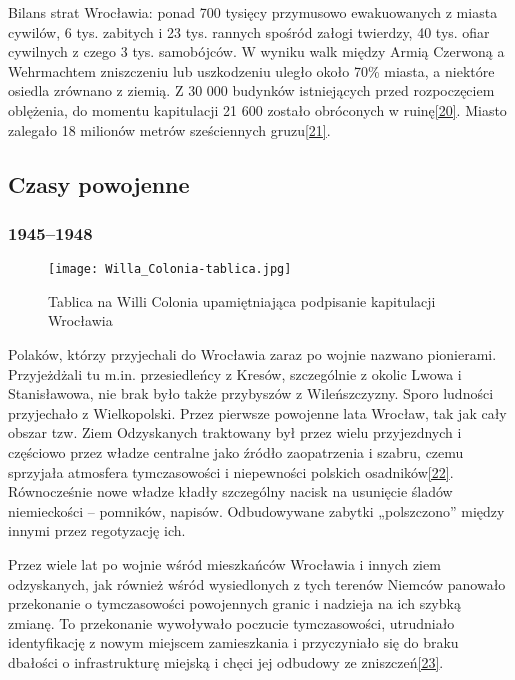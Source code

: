 \documentclass{article}
\begin{document}
Bilans strat Wrocławia: ponad 700 tysięcy przymusowo ewakuowanych z miasta cywilów, 6 tys. zabitych i 23 tys. rannych spośród załogi twierdzy, 40 tys. ofiar cywilnych z czego 3 tys. samobójców. W wyniku walk między Armią Czerwoną a Wehrmachtem zniszczeniu lub uszkodzeniu uległo około 70\% miasta, a niektóre osiedla zrównano z ziemią. Z 30 000 budynków istniejących przed rozpoczęciem oblężenia, do momentu kapitulacji 21 600 zostało obróconych w ruinę\hyperref[20]{[20]}. Miasto zalegało 18 milionów metrów sześciennych gruzu\hyperref[21]{[21]}.

\subsection{Czasy powojenne}
\subsubsection{1945–1948} 

\begin{wrapfigure}{r}{0.45\textwidth} 
\begin{center}
\vspace{-20pt}
\texttt{[image: Willa\_Colonia-tablica.jpg]}
\end{center}
\vspace{-20pt}
\caption{Tablica na Willi Colonia upamiętniająca podpisanie kapitulacji Wrocławia}
\vspace{-10pt}
\end{wrapfigure}

Polaków, którzy przyjechali do Wrocławia zaraz po wojnie nazwano pionierami. Przyjeżdżali tu m.in. przesiedleńcy z Kresów, szczególnie z okolic Lwowa i Stanisławowa, nie brak było także przybyszów z Wileńszczyzny. Sporo ludności przyjechało z Wielkopolski. Przez pierwsze powojenne lata Wrocław, tak jak cały obszar tzw. Ziem Odzyskanych traktowany był przez wielu przyjezdnych i częściowo przez władze centralne jako źródło zaopatrzenia i szabru, czemu sprzyjała atmosfera tymczasowości i niepewności polskich osadników\hyperref[22]{[22]}. Równocześnie nowe władze kładły szczególny nacisk na usunięcie śladów niemieckości – pomników, napisów. Odbudowywane zabytki „polszczono” między innymi przez regotyzację ich.

Przez wiele lat po wojnie wśród mieszkańców Wrocławia i innych ziem odzyskanych, jak również wśród wysiedlonych z tych terenów Niemców panowało przekonanie o tymczasowości powojennych granic i nadzieja na ich szybką zmianę. To przekonanie wywoływało poczucie tymczasowości, utrudniało identyfikację z nowym miejscem zamieszkania i przyczyniało się do braku dbałości o infrastrukturę miejską i chęci jej odbudowy ze zniszczeń\hyperref[23]{[23]}.
\end{document}
